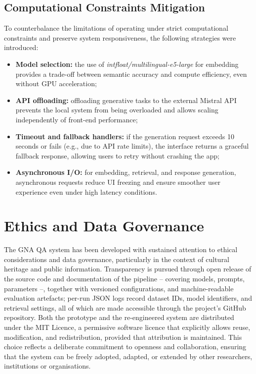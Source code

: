 \begin{spacing}{1.5}
\subsection{Computational Constraints Mitigation}
To counterbalance the limitations of operating under strict computational constraints and preserve system responsiveness, the following strategies were introduced:
\begin{itemize}
\item \textbf{Model selection:} the use of \textit{intfloat/multilingual-e5-large} for embedding provides a trade-off between semantic accuracy and compute efficiency, even without GPU acceleration;
\item \textbf{API offloading:} offloading generative tasks to the external Mistral API prevents the local system from being overloaded and allows scaling independently of front-end performance;
\item \textbf{Timeout and fallback handlers:} if the generation request exceeds 10 seconds or fails (e.g., due to API rate limits), the interface returns a graceful fallback response, allowing users to retry without crashing the app;
\item \textbf{Asynchronous I/O:} for embedding, retrieval, and response generation, asynchronous requests reduce UI freezing and ensure smoother user experience even under high latency conditions.
\end{itemize}


\section{Ethics and Data Governance}
The GNA QA system has been developed with sustained attention to ethical considerations and data governance, particularly in the context of cultural heritage and public information. Transparency is pursued through open release of the source code and documentation of the pipeline -- covering models, prompts, parameters --, together with versioned configurations, and machine-readable evaluation artefacts; per-run JSON logs record dataset IDs, model identifiers, and retrieval settings, all of which are made accessible through the project’s GitHub repository. Both the prototype and the re-engineered system are distributed under the MIT Licence, a permissive software licence that explicitly allows reuse, modification, and redistribution, provided that attribution is maintained. This choice reflects a deliberate commitment to openness and collaboration, ensuring that the system can be freely adopted, adapted, or extended by other researchers, institutions or organisations.


\end{spacing}
